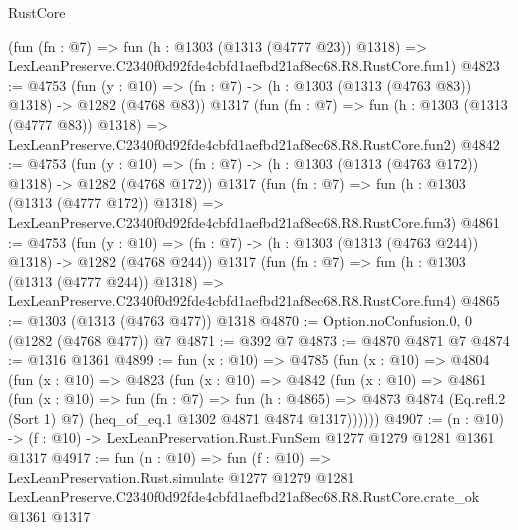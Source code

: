 \begin{lexlean}{RustCore}
\begin{coremodule}
    (fun (fn : @7) =>
    fun (h : @1303 (@1313 (@4777 @23)) @1318) =>
    LexLeanPreserve.C2340f0d92fde4cbfd1aefbd21af8ec68.R8.RustCore.fun1)
@4823 := @4753
    (fun (y : @10) => (fn : @7) -> (h : @1303 (@1313 (@4763 @83)) @1318) -> @1282 (@4768 @83))
    @1317
    (fun (fn : @7) =>
    fun (h : @1303 (@1313 (@4777 @83)) @1318) =>
    LexLeanPreserve.C2340f0d92fde4cbfd1aefbd21af8ec68.R8.RustCore.fun2)
@4842 := @4753
    (fun (y : @10) => (fn : @7) -> (h : @1303 (@1313 (@4763 @172)) @1318) -> @1282 (@4768 @172))
    @1317
    (fun (fn : @7) =>
    fun (h : @1303 (@1313 (@4777 @172)) @1318) =>
    LexLeanPreserve.C2340f0d92fde4cbfd1aefbd21af8ec68.R8.RustCore.fun3)
@4861 := @4753
    (fun (y : @10) => (fn : @7) -> (h : @1303 (@1313 (@4763 @244)) @1318) -> @1282 (@4768 @244))
    @1317
    (fun (fn : @7) =>
    fun (h : @1303 (@1313 (@4777 @244)) @1318) =>
    LexLeanPreserve.C2340f0d92fde4cbfd1aefbd21af8ec68.R8.RustCore.fun4)
@4865 := @1303 (@1313 (@4763 @477)) @1318
@4870 := Option.noConfusion.{0, 0} (@1282 (@4768 @477)) @7
@4871 := @392 @7
@4873 := @4870 @4871 @7
@4874 := @1316 @1361
@4899 := fun (x : @10) =>
  @4785
    (fun (x : @10) =>
    @4804
      (fun (x : @10) =>
      @4823
        (fun (x : @10) =>
        @4842
          (fun (x : @10) =>
          @4861
            (fun (x : @10) =>
            fun (fn : @7) =>
            fun (h : @4865) =>
            @4873 @4874 (Eq.refl.{2} (Sort 1) @7) (heq_of_eq.{1} @1302 @4871 @4874 @1317))))))
@4907 := (n : @10) -> (f : @10) -> LexLeanPreservation.Rust.FunSem @1277 @1279 @1281 @1361 @1317
@4917 := fun (n : @10) =>
  fun (f : @10) =>
  LexLeanPreservation.Rust.simulate
    @1277
    @1279
    @1281
    LexLeanPreserve.C2340f0d92fde4cbfd1aefbd21af8ec68.R8.RustCore.crate_ok
    @1361
    @1317
\end{coremodule}
\end{lexlean}
